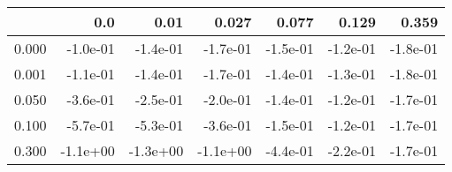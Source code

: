 \begin{tabular}{lrrrrrr}
\toprule
{} &      0.0 &     0.01 &    0.027 &    0.077 &    0.129 &    0.359 \\
\midrule
0.000 & -1.0e-01 & -1.4e-01 & -1.7e-01 & -1.5e-01 & -1.2e-01 & -1.8e-01 \\
0.001 & -1.1e-01 & -1.4e-01 & -1.7e-01 & -1.4e-01 & -1.3e-01 & -1.8e-01 \\
0.050 & -3.6e-01 & -2.5e-01 & -2.0e-01 & -1.4e-01 & -1.2e-01 & -1.7e-01 \\
0.100 & -5.7e-01 & -5.3e-01 & -3.6e-01 & -1.5e-01 & -1.2e-01 & -1.7e-01 \\
0.300 & -1.1e+00 & -1.3e+00 & -1.1e+00 & -4.4e-01 & -2.2e-01 & -1.7e-01 \\
\bottomrule
\end{tabular}
